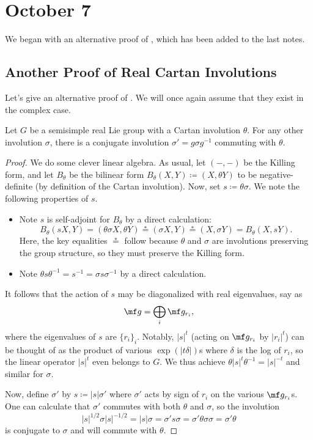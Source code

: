 \documentclass[../notes.tex]{subfiles}
\begin{document}
\section{October 7}
We began with an alternative proof of , which has been added to the last notes.

\subsection{Another Proof of Real Cartan Involutions}
Let's give an alternative proof of . We will once again assume that they exist in the complex case.
\begin{lemma} \label{lem:make-involutions-commute}
	Let $G$ be a semisimple real Lie group with a Cartan involution $\theta$. For any other involution $\sigma$, there is a conjugate involution $\sigma'=g\sigma g^{-1}$ commuting with $\theta$.
\end{lemma}
\begin{proof}
	We do some clever linear algebra. As usual, let $(-,-)$ be the Killing form, and let $B_\theta$ be the bilinear form $B_\theta(X,Y)\coloneqq(X,\theta Y)$ to be negative-definite (by definition of the Cartan involution). Now, set $s\coloneqq\theta\sigma$. We note the following properties of $s$.
	\begin{itemize}
		\item Note $s$ is self-adjoint for $B_\theta$ by a direct calculation:
		\[B_\theta(sX,Y)=(\theta\sigma X,\theta Y)\stackrel*=(\sigma X,Y)\stackrel*=(X,\sigma Y)=B_\theta(X,sY).\]
		Here, the key equalities $\stackrel*=$ follow because $\theta$ and $\sigma$ are involutions preserving the group structure, so they must preserve the Killing form.
		\item Note $\theta s\theta^{-1}=s^{-1}=\sigma s\sigma^{-1}$ by a direct calculation.
	\end{itemize}
	It follows that the action of $s$ may be diagonalized with real eigenvalues, say as
	\[\mf g=\bigoplus_i\mf g_{r_i},\]
	where the eigenvalues of $s$ are $\{r_i\}_i$. Notably, $\left|s\right|^t$ (acting on $\mf g_{r_i}$ by $\left|r_i\right|^t$) can be thought of as the product of various $\exp(\left|t\delta\right|)$s where $\delta$ is the log of $r_i$, so the linear operator $\left|s\right|^t$ even belongs to $G$. We thus achieve $\theta\left|s\right|^t\theta^{-1}=\left|s\right|^{-t}$ and similar for $\sigma$.

	Now, define $\sigma'$ by $s\coloneqq\left|s\right|\sigma'$ where $\sigma'$ acts by sign of $r_i$ on the various $\mf g_{r_i}$s. One can calculate that $\sigma'$ commutes with both $\theta$ and $\sigma$, so the involution
	\[\left|s\right|^{1/2}\sigma\left|s\right|^{-1/2}=\left|s\right|\sigma=\sigma's\sigma=\sigma'\theta\sigma\sigma=\sigma'\theta\]
	is conjugate to $\sigma$ and will commute with $\theta$.
\end{proof}
\end{document}
